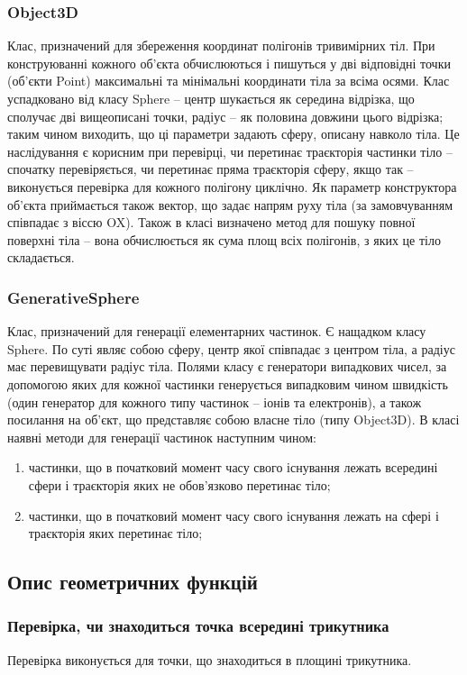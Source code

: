\documentclass[a4paper,12pt]{article}
\begin{document}
\subsubsection{Object3D}
Клас, призначений для збереження координат полігонів тривимірних тіл. При конструюванні кожного об’єкта обчислюються і пишуться у дві відповідні точки (об’єкти Point) максимальні та мінімальні координати тіла за всіма осями. Клас успадковано від класу Sphere -- центр шукається як середина відрізка, що сполучає дві вищеописані точки, радіус -- як половина довжини цього відрізка; таким чином виходить, що ці параметри задають сферу, описану навколо тіла. Це наслідування є корисним при перевірці, чи перетинає траєкторія частинки тіло -- спочатку перевіряється, чи перетинає пряма траєкторія сферу, якщо так -- виконується перевірка для кожного полігону циклічно. Як параметр конструктора об’єкта приймається також вектор, що задає напрям руху тіла (за замовчуванням співпадає з віссю OX). Також в класі визначено метод для пошуку повної поверхні тіла -- вона обчислюється як сума площ всіх полігонів, з яких це тіло складається.

\subsubsection{GenerativeSphere}
Клас, призначений для генерації елементарних частинок. Є нащадком класу Sphere. По суті являє собою сферу, центр якої співпадає з центром тіла, а радіус має перевищувати радіус тіла. Полями класу є генератори випадкових чисел, за допомогою яких для кожної частинки генерується випадковим чином швидкість (один генератор для кожного типу частинок -- іонів та електронів), а також посилання на об’єкт, що представляє собою власне тіло (типу Object3D). В класі наявні методи для генерації частинок наступним чином:
\begin{enumerate}
 \item частинки, що в початковий момент часу свого існування лежать всередині сфери і траєкторія яких не обов’язково перетинає тіло;
 \item частинки, що в початковий момент часу свого існування лежать на сфері і траєкторія яких перетинає тіло;
\end{enumerate}

\subsection{Опис геометричних функцій}
\subsubsection{Перевірка, чи знаходиться точка всередині трикутника}
Перевірка виконується для точки, що знаходиться в площині трикутника.
\end{document}
